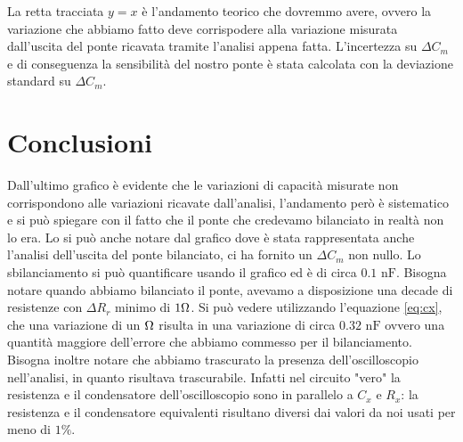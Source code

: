 \documentclass[12pt,]{article}
\begin{document}
La retta tracciata $y=x$ è l'andamento teorico che dovremmo avere, ovvero la variazione che abbiamo fatto deve corrispodere alla variazione misurata dall'uscita del ponte ricavata tramite l'analisi appena fatta. L'incertezza su $\Delta C_m$ e di conseguenza la sensibilità del nostro ponte è stata calcolata con la deviazione standard su $\Delta C_m$.
\section{Conclusioni}
Dall'ultimo grafico è evidente che le variazioni di capacità misurate non corrispondono alle variazioni ricavate dall'analisi, l'andamento però è sistematico e si può spiegare con il fatto che il ponte che credevamo bilanciato in realtà non lo era. Lo si può anche notare dal grafico dove è stata rappresentata anche l'analisi dell'uscita del ponte bilanciato, ci ha fornito un $\Delta C_m$ non nullo. Lo sbilanciamento si può quantificare usando il grafico ed è di circa $0.1 \text{ nF}$. Bisogna notare quando abbiamo bilanciato il ponte, avevamo a disposizione una decade di resistenze con $\Delta R_r$ minimo di $1 \ohm$. Si può vedere utilizzando l'equazione \eqref{eq:cx}, che una variazione di un $\ohm$ risulta in una variazione di circa $0.32 \text{ nF}$ ovvero una quantità maggiore dell'errore che abbiamo commesso per il bilanciamento.\\
Bisogna inoltre notare che abbiamo trascurato la presenza dell'oscilloscopio nell'analisi, in quanto risultava trascurabile. Infatti nel circuito "vero" la resistenza e il condensatore dell'oscilloscopio sono in parallelo a $C_x$ e $R_x$: la resistenza e il condensatore equivalenti risultano diversi dai valori da noi usati per meno di $1 \%$. 
\end{document}
